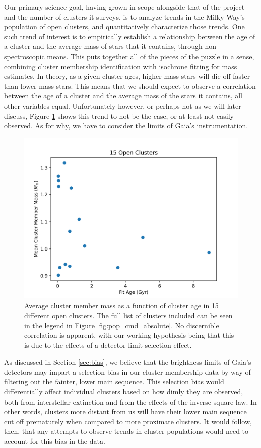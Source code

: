 \documentclass[onecolumn,table,xcdraw,super]{aastex631}
\begin{document}
Our primary science goal, having grown in scope alongside that of the project and the number of clusters it surveys, is to analyze trends in the Milky Way's population of open clusters, and quantitatively characterize those trends. One such trend of interest is to empirically establish a relationship between the age of a cluster and the average mass of stars that it contains, through non-spectroscopic means. This puts together all of the pieces of the puzzle in a sense, combining cluster membership identification with isochrone fitting for mass estimates. In theory, as a given cluster ages, higher mass stars will die off faster than lower mass stars. This means that we should expect to observe a correlation between the age of a cluster and the average mass of the stars it contains, all other variables equal. Unfortunately however, or perhaps not as we will later discuss, Figure \ref{fig:mass_vs_age_filtered} shows this trend to not be the case, or at least not easily observed. As for why, we have to consider the limits of Gaia's instrumentation.

\begin{figure}[]
    \centering
      \includegraphics[width=4.75in]{figures/mass_vs_age_filtered.png}
    \caption{Average cluster member mass as a function of cluster age in 15 different open clusters. The full list of clusters included can be seen in the legend in Figure \ref{fig:pop_cmd_absolute}. No discernible correlation is apparent, with our working hypothesis being that this is due to the effects of a detector limit selection effect.}
    \label{fig:mass_vs_age_filtered}
\end{figure}

As discussed in Section \ref{sec:bias}, we believe that the brightness limits of Gaia's detectors may impart a selection bias in our cluster membership data by way of filtering out the fainter, lower main sequence. This selection bias would differentially affect individual clusters based on how dimly they are observed, both from interstellar extinction and from the effects of the inverse square law. In other words, clusters more distant from us will have their lower main sequence cut off prematurely when compared to more proximate clusters. It would follow, then, that any attempts to observe trends in cluster populations would need to account for this bias in the data.
\end{document}
